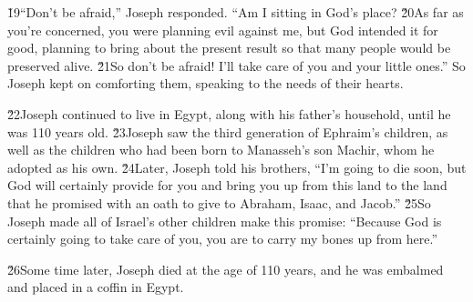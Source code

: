 \v{19}``Don't be afraid,'' Joseph responded. ``Am I sitting in God's place? \v{20}As far as you're concerned, you were planning evil against me, but God intended it for good, planning to bring about the present result so that many people would be preserved alive. \v{21}So don't be afraid! I'll take care of you and your little ones.'' So Joseph kept on comforting them, speaking to the needs of their hearts.

\v{22}Joseph continued to live in Egypt, along with his father's household, until he was 110 years old. \v{23}Joseph saw the third generation of Ephraim's children, as well as the children who had been born to Manasseh's son Machir, whom he adopted as his own. \v{24}Later, Joseph told his brothers, ``I'm going to die soon, but God will certainly provide for you and bring you up from this land to the land that he promised with an oath to give to Abraham, Isaac, and Jacob.'' \v{25}So Joseph made all of Israel's other children make this promise: ``Because God is certainly going to take care of you, you are to carry my bones up from here.''

\v{26}Some time later, Joseph died at the age of 110 years, and he was embalmed and placed in a coffin in Egypt.
